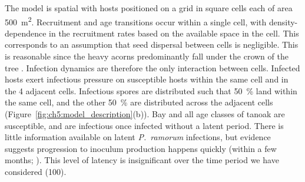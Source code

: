 The model is spatial with hosts positioned on a grid in square cells each of area \SI{500}{\meter\squared}. Recruitment and age transitions occur within a single cell, with density-dependence in the recruitment rates based on the available space in the cell. This corresponds to an assumption that seed dispersal between cells is negligible. This is reasonable since the heavy acorns predominantly fall under the crown of the tree \citep{tappeiner_lithocarpus_1990}. Infection dynamics are therefore the only interaction between cells. Infected hosts exert infectious pressure on susceptible hosts within the same cell and in the 4 adjacent cells. Infectious spores are distributed such that \SI{50}{\percent} land within the same cell, and the other \SI{50}{\percent} are distributed across the adjacent cells (Figure~\ref{fig:ch5:model_description}(b)). Bay and all age classes of tanoak are susceptible, and are infectious once infected without a latent period. There is little information available on latent \emph{P.~ramorum} infections, but evidence suggests progression to inoculum production happens quickly (within a few months; \cite{davidson_transmission_2005}). This level of latency is insignificant over the time period we have considered (\SI{100}{\years}).

